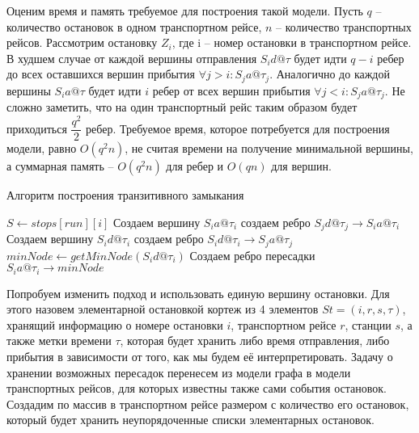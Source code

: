 Оценим время и память требуемое для построения такой модели. Пусть $q$ -- количество остановок в одном транспортном рейсе, $n$ -- количество транспортных рейсов. Рассмотрим остановку $Z_i$, где i -- номер остановки в транспортном рейсе. В худшем случае от каждой вершины отправления $S_id@\tau$ будет идти $q-i$ ребер до всех оставшихся вершин прибытия $\forall j > i : S_ja@\tau_j$. Аналогично до каждой вершины $S_ia@\tau$ будет идти $i$ ребер от всех вершин прибытия $\forall j < i : S_ja@\tau_j$. Не сложно заметить, что на один транспортный рейс таким образом будет приходиться $\dfrac{q^2}{2}$ ребер. Требуемое время, которое потребуется для построения модели, равно $O(q^2n)$, не считая времени на получение минимальной вершины, а суммарная память -- $O(q^2n)$ для ребер и $O(qn)$ для вершин.

\begin{algorithm}[!h]
	\caption{Алгоритм построения транзитивного замыкания}\label{lst3}
	\begin{algorithmic}
		\State $S \gets stops[run][i]$ 
		\State Создаем вершину $S_ia@\tau_i$
		\State создаем ребро $S_jd@\tau_j \rightarrow S_ia@\tau_i$
		\EndFor
		\State Создаем вершину $S_id@\tau_i$
		\State создаем ребро $S_id@\tau_i \rightarrow S_ja@\tau_j$
		\EndFor
		\State $minNode \gets getMinNode(S_id@\tau_i)$ 
		\State Создаем ребро пересадки $S_ia@\tau_i \rightarrow minNode$
		\EndFor
		\EndFor
		\EndFunction
	\end{algorithmic}
\end{algorithm}

Попробуем изменить подход и использовать единую вершину остановки. Для этого назовем элементарной остановкой кортеж из 4 элементов $St=(i, r, s, \tau)$, хранящий информацию о номере остановки $i$, транспортном рейсе $r$, станции $s$, а также метки времени $\tau$, которая будет хранить либо время отправления, либо прибытия в зависимости от того, как мы будем её интерпретировать. Задачу о хранении возможных пересадок перенесем из модели графа в модели транспортных рейсов, для которых известны также сами события остановок. Создадим по массив в транспортном рейсе размером с количество его остановок, который будет хранить неупорядоченные списки элементарных остановок.

